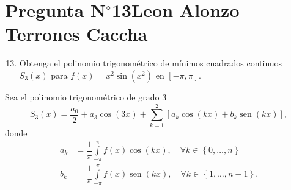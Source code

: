 \section{Pregunta N$^{\circ}$13\qquad Leon Alonzo Terrones Caccha}

\begin{frame}
    \begin{enumerate}\setcounter{enumi}{12}
        \item

              Obtenga el polinomio trigonométrico de mínimos
              cuadrados continuos $S_{3}\left(x\right)$ para
              \begin{math}
                  f\left(x\right)=
                  x^{2}\sin
                  \left(x^{2}\right)
              \end{math}
              en
              \begin{math}
                  \left[-\pi,\pi\right]
              \end{math}.
    \end{enumerate}

    \begin{solution}
        Sea el polinomio trigonométrico de grado $3$
        \begin{equation*}
            S_{3}\left(x\right)=
            \dfrac{a_{0}}{2}+
            a_{3}\cos\left(3x\right)+
            \sum_{k=1}^{2}
            \left[
                a_{k}\cos\left(kx\right)+
                b_{k}\operatorname{sen}\left(kx\right)
                \right],
        \end{equation*}
        donde
        \begin{align*}
            a_{k} & =
            \dfrac{1}{\pi}
            \int\limits_{-\pi}^{\pi}
            f\left(x\right)\cos\left(kx\right),\quad
            \forall k\in\left\{0,\dotsc,n\right\} \\
            b_{k} & =
            \dfrac{1}{\pi}
            \int\limits_{-\pi}^{\pi}
            f\left(x\right)\operatorname{sen}\left(kx\right),\quad
            \forall k\in\left\{1,\dotsc,n-1\right\}.
        \end{align*}
    \end{solution}
\end{frame}

